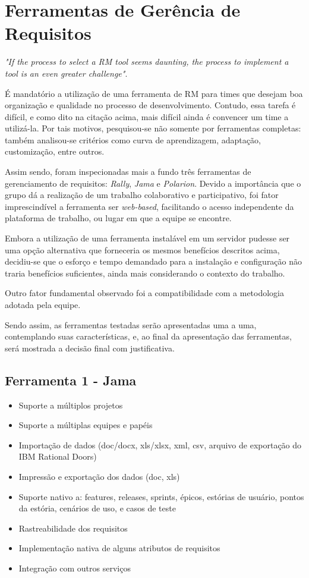 \chapter[Ferramentas de Gerência de Requisitos]{Ferramentas de Gerência de Requisitos}

\emph{"If the process to select a RM tool seems daunting, the process to implement a tool is an even greater challenge"}\cite{beatty001}.

É mandatório a utilização de uma ferramenta de RM para times que desejam boa organização e qualidade no processo de desenvolvimento. Contudo, essa tarefa é difícil, e como dito na citação acima, mais difícil ainda é convencer um time a utilizá-la. Por tais motivos, pesquisou-se não somente por ferramentas completas: também analisou-se critérios como curva de aprendizagem, adaptação, customização, entre outros.

Assim sendo, foram inspecionadas mais a fundo três ferramentas de gerenciamento de requisitos: \emph{Rally}, \emph{Jama} e \emph{Polarion}. Devido a importância que o grupo dá a realização de um trabalho colaborativo e participativo, foi fator imprescindível a ferramenta ser \emph{web-based}, facilitando o acesso independente da plataforma de trabalho, ou lugar em que a equipe se encontre.

Embora a utilização de uma ferramenta instalável em um servidor pudesse ser uma opção alternativa que forneceria os mesmos benefícios descritos acima, decidiu-se que o esforço e tempo demandado para a instalação e configuração não traria benefícios suficientes, ainda mais considerando o contexto do trabalho.

Outro fator fundamental observado foi a compatibilidade com a metodologia adotada pela equipe.

Sendo assim, as ferramentas testadas serão apresentadas uma a uma, contemplando suas características, e, ao final da apresentação das ferramentas, será mostrada a decisão final com justificativa.

\section{Ferramenta 1 - Jama}
\begin{itemize}
  \item Suporte a múltiplos projetos
  \item Suporte a múltiplas equipes e papéis
  \item Importação de dados (doc/docx, xls/xlsx, xml, csv, arquivo de exportação do IBM Rational Doors)
  \item Impressão e exportação dos dados (doc, xls)
  \item Suporte nativo a: features, releases, sprints, épicos, estórias de usuário, pontos da estória, cenários de uso, e casos de teste
  \item Rastreabilidade dos requisitos
  \item Implementação nativa de alguns atributos de requisitos
  \item Integração com outros serviços
\end{itemize}

